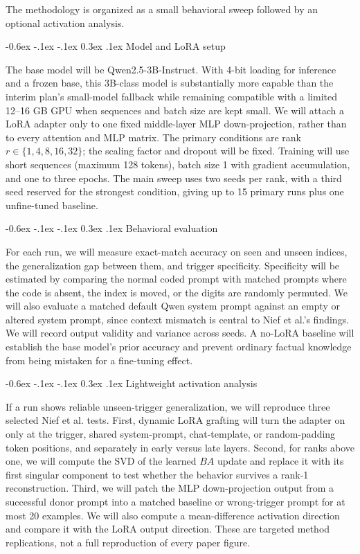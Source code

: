 \documentclass[10pt,a4paper,twocolumn]{article}
\makeatletter
\renewcommand{\subsection}{\@startsection{subsection}{2}{\z@}%
  {-0.6ex \@plus -.1ex \@minus -.1ex}%
  {0.3ex \@plus .1ex}%
  {\normalfont\bfseries\normalsize}}
\makeatother
\begin{document}
The methodology is organized as a small behavioral sweep followed by an optional activation analysis.

\subsection{Model and LoRA setup}

The base model will be Qwen2.5-3B-Instruct. With 4-bit loading for inference and a frozen base, this 3B-class model is substantially more capable than the interim plan's small-model fallback while remaining compatible with a limited 12--16 GB GPU when sequences and batch size are kept small. We will attach a LoRA adapter only to one fixed middle-layer MLP down-projection, rather than to every attention and MLP matrix. The primary conditions are rank $r \in \{1,4,8,16,32\}$; the scaling factor and dropout will be fixed. Training will use short sequences (maximum 128 tokens), batch size 1 with gradient accumulation, and one to three epochs. The main sweep uses two seeds per rank, with a third seed reserved for the strongest condition, giving up to 15 primary runs plus one unfine-tuned baseline.

\subsection{Behavioral evaluation}

For each run, we will measure exact-match accuracy on seen and unseen indices, the generalization gap between them, and trigger specificity. Specificity will be estimated by comparing the normal coded prompt with matched prompts where the code is absent, the index is moved, or the digits are randomly permuted. We will also evaluate a matched default Qwen system prompt against an empty or altered system prompt, since context mismatch is central to Nief et al.'s findings. We will record output validity and variance across seeds. A no-LoRA baseline will establish the base model's prior accuracy and prevent ordinary factual knowledge from being mistaken for a fine-tuning effect.

\subsection{Lightweight activation analysis}

If a run shows reliable unseen-trigger generalization, we will reproduce three selected Nief et al. tests. First, dynamic LoRA grafting will turn the adapter on only at the trigger, shared system-prompt, chat-template, or random-padding token positions, and separately in early versus late layers. Second, for ranks above one, we will compute the SVD of the learned $BA$ update and replace it with its first singular component to test whether the behavior survives a rank-1 reconstruction. Third, we will patch the MLP down-projection output from a successful donor prompt into a matched baseline or wrong-trigger prompt for at most 20 examples. We will also compute a mean-difference activation direction and compare it with the LoRA output direction. These are targeted method replications, not a full reproduction of every paper figure.
\end{document}
